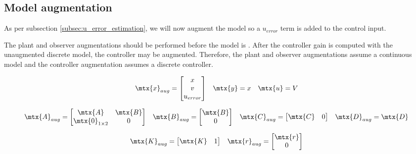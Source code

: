 \subsection{Model augmentation}

As per subsection \ref{subsec:u_error_estimation}, we will now augment the
\gls{model} so a $u_{error}$ term is added to the \gls{control input}.

The \gls{plant} and \gls{observer} augmentations should be performed before the
\gls{model} is . After the \gls{controller}
gain is computed with the unaugmented discrete \gls{model}, the controller may
be augmented. Therefore, the \gls{plant} and \gls{observer} augmentations assume
a continuous \gls{model} and the \gls{controller} augmentation assumes a
discrete \gls{controller}.

\begin{equation*}
  \begin{array}{ccc}
    \mtx{x}_{aug} =
    \begin{bmatrix}
      x \\
      v \\
      u_{error}
    \end{bmatrix} &
    \mtx{y} = x &
    \mtx{u} = V
  \end{array}
\end{equation*}

\begin{equation}
  \begin{array}{cccc}
    \mtx{A}_{aug} =
    \begin{bmatrix}
      \mtx{A} & \mtx{B} \\
      \mtx{0}_{1 \times 2} & 0
    \end{bmatrix} &
    \mtx{B}_{aug} =
    \begin{bmatrix}
      \mtx{B} \\
      0
    \end{bmatrix} &
    \mtx{C}_{aug} = \begin{bmatrix}
      \mtx{C} & 0
    \end{bmatrix} &
    \mtx{D}_{aug} = \mtx{D}
  \end{array}
\end{equation}

\begin{equation}
  \begin{array}{cc}
    \mtx{K}_{aug} = \begin{bmatrix}
      \mtx{K} & 1
    \end{bmatrix} &
    \mtx{r}_{aug} = \begin{bmatrix}
      \mtx{r} \\
      0
    \end{bmatrix}
  \end{array}
\end{equation}


